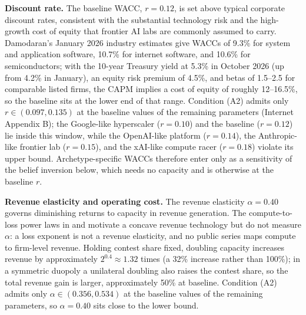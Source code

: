 \documentclass[
  11pt,
  letterpaper,
]{scrartcl}
\begin{document}
\textbf{Discount rate.} The baseline WACC, \(r = 0.12\), is set above
typical corporate discount rates, consistent with the substantial
technology risk and the high-growth cost of equity that frontier AI labs
are commonly assumed to carry. Damodaran's January 2026 industry
estimates give WACCs of 9.3\% for system and application software,
10.7\% for internet software, and 10.6\% for semiconductors; with the
10-year Treasury yield at 5.3\% in October 2026 (up from 4.2\% in
January), an equity risk premium of 4.5\%, and betas of 1.5--2.5 for
comparable listed firms, the CAPM implies a cost of equity of roughly
12--16.5\%, so the baseline sits at the lower end of that range.
Condition (A2) admits only \(r \in (0.097, 0.135)\) at the baseline
values of the remaining parameters (Internet Appendix B); the
Google-like hyperscaler (\(r=0.10\)) and the baseline (\(r=0.12\)) lie
inside this window, while the OpenAI-like platform (\(r=0.14\)), the
Anthropic-like frontier lab (\(r=0.15\)), and the xAI-like compute racer
(\(r=0.18\)) violate its upper bound. Archetype-specific WACCs therefore
enter only as a sensitivity of the belief inversion below, which needs
no capacity and is otherwise at the baseline \(r\).

\textbf{Revenue elasticity and operating cost.} The revenue elasticity
\(\alpha = 0.40\) governs diminishing returns to capacity in revenue
generation. The compute-to-loss power laws in \citet{kaplan2020scaling}
and \citet{hoffmann2022training} motivate a concave revenue technology
but do not measure \(\alpha\): a loss exponent is not a revenue
elasticity, and no public series maps compute to firm-level revenue.
Holding contest share fixed, doubling capacity increases revenue by
approximately \(2^{0.4} \approx 1.32\) times (a 32\% increase rather
than 100\%); in a symmetric duopoly a unilateral doubling also raises
the contest share, so the total revenue gain is larger, approximately
50\% at baseline. Condition (A2) admits only
\(\alpha \in (0.356, 0.534)\) at the baseline values of the remaining
parameters, so \(\alpha = 0.40\) sits close to the lower bound.
\end{document}
